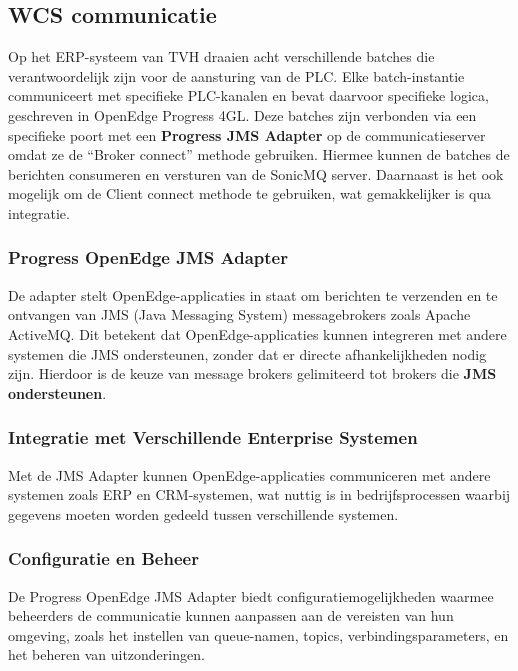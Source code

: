 \subsection{WCS communicatie} 
Op het ERP-systeem van TVH draaien acht verschillende batches die verantwoordelijk zijn voor de aansturing van de PLC. 
Elke batch-instantie communiceert met specifieke PLC-kanalen en bevat daarvoor specifieke logica, geschreven in OpenEdge Progress 4GL.
Deze batches zijn verbonden via een specifieke poort met een \textbf{Progress JMS Adapter} op de communicatieserver omdat ze de ``Broker connect'' methode gebruiken.
Hiermee kunnen de batches de berichten consumeren en versturen van de SonicMQ server.
Daarnaast is het ook mogelijk om de Client connect methode te gebruiken, wat gemakkelijker is qua integratie.

\subsubsection{Progress OpenEdge JMS Adapter}
De adapter stelt OpenEdge-applicaties in staat om berichten te verzenden en te ontvangen van JMS (Java Messaging System)
messagebrokers zoals Apache ActiveMQ. 
Dit betekent dat OpenEdge-applicaties kunnen integreren met andere systemen die JMS ondersteunen, 
zonder dat er directe afhankelijkheden nodig zijn.
Hierdoor is de keuze van message brokers gelimiteerd tot brokers die \textbf{JMS ondersteunen}.

\subsubsection{Integratie met Verschillende Enterprise Systemen}
Met de JMS Adapter kunnen OpenEdge-applicaties communiceren met andere systemen zoals ERP en CRM-systemen, 
wat nuttig is in bedrijfsprocessen waarbij gegevens moeten worden gedeeld tussen verschillende systemen.

\subsubsection{Configuratie en Beheer}
De Progress OpenEdge JMS Adapter biedt configuratiemogelijkheden waarmee beheerders de communicatie kunnen aanpassen 
aan de vereisten van hun omgeving, zoals het instellen van queue-namen, topics, verbindingsparameters, en het beheren van uitzonderingen.


